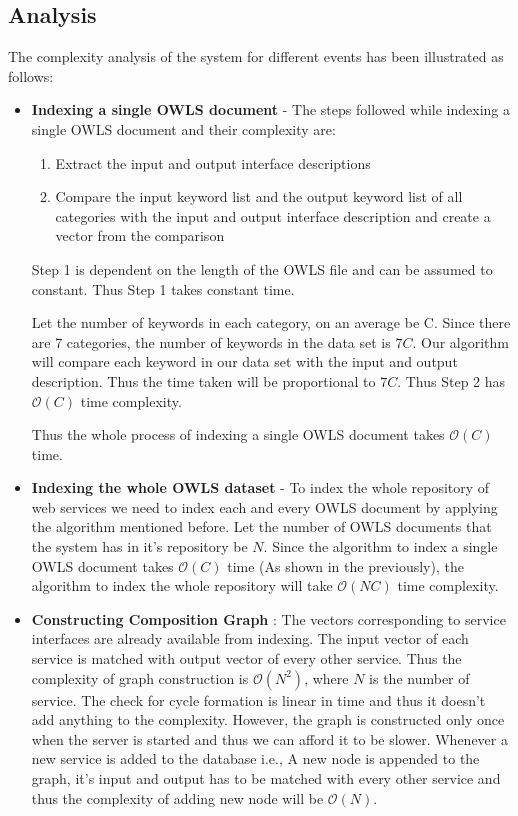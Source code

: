 \documentclass[12pt, oneside]{book}
\begin{document}
\subsection{Analysis}
The complexity analysis of the system for different events has been illustrated as follows:
\begin{itemize}
 \item \textbf{Indexing a single OWLS document} - The steps followed while indexing a single OWLS document and their complexity are:
 \begin{enumerate}
  \item Extract the input and output interface descriptions
  \item Compare the input keyword list and the output keyword list of all categories with the input and output interface description and create a vector from the comparison
 \end{enumerate}
 Step 1 is dependent on the length of the OWLS file and can be assumed to constant. Thus Step 1 takes constant time. \\ \par
 Let the number of keywords in each category, on an average be C. Since there are 7 categories, the number of keywords in the data set is $7C$. Our algorithm will compare each keyword in our data set with the input and output description. Thus the time taken will be proportional to $7C$. Thus Step 2 has $ \mathcal{O}(C)$ time complexity. \\ \par
 Thus the whole process of indexing a single OWLS document takes $\mathcal{O}(C)$ time.
 \item \textbf{Indexing the whole OWLS dataset} - To index the whole repository of web services we need to index each and every OWLS document by applying the algorithm mentioned before. Let the number of OWLS documents that the system has in it's repository be $N$. Since the algorithm to index a single OWLS document takes $\mathcal{O}(C)$ time (As shown in the previously), the algorithm to index the whole repository will take $\mathcal{O}(NC)$ time complexity.
 \item \textbf{Constructing Composition Graph} : The vectors corresponding to service interfaces are already available from indexing. The input vector of each service is matched with output vector of every other service. Thus the complexity of graph construction is $\mathcal{O}(N^{2})$, where $N$ is the number of service. The check for cycle formation is linear in time and thus it doesn't add anything to the complexity. However, the graph is constructed only once when the server is started and thus we can afford it to be slower. Whenever a new service is added to the database i.e., A new node is appended to the graph, it's input and output has to be matched with every other service and thus the complexity of adding new node will be $\mathcal{O}(N)$.

\end{itemize}
\end{document}
